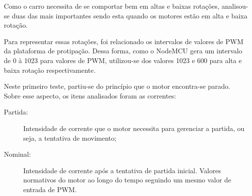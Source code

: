 	Como o carro necessita de se comportar bem em altas e baixas rotações, analisou-se duas das mais importantes sendo esta quando os motores estão em alta e baixa rotação.%


	Para representar essas rotações, foi relacionado os intervalos de valores de PWM da plataforma de protipação. Dessa forma, como o NodeMCU gera um intervalo de 0 à 1023 para valores de PWM, utilizou-se dos valores 1023 e 600 para alta e baixa rotação respectivamente. 

	Neste primeiro teste, partiu-se do princípio que o motor encontra-se parado. Sobre esse aspecto, os itens analisados foram as correntes:

	\begin{description}
		\item [Partida:] Intensidade de corrente que o motor necessita para gerenciar a partida, ou seja, a tentativa de movimento;
		\item [Nominal:] Intensidade de corrente após a tentativa de partida inicial. Valores normativos do motor ao longo do tempo seguindo um mesmo valor de entrada de PWM.
	\end{description}

